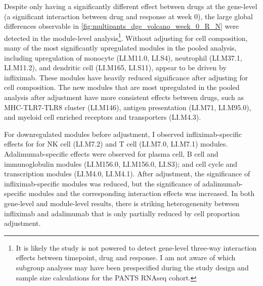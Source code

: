 Despite only  having a significantly different effect between drugs at the gene-level (a significant interaction between drug and response at week 0), 
the large global differences observable in \autoref{fig:multipants_dge_volcano_week_0_R_N} were detected in the module-level analysis\footnote{
It is likely the study is not powered to detect gene-level three-way interaction effects between timepoint, drug and response.
I am not aware of which subgroup analyses may have been prespecified during the study design and sample size calculations for the \gls{PANTS} \gls{RNAseq} cohort.
}.
Without adjusting for cell composition, many of the most significantly upregulated modules in the pooled analysis, 
including upregulation of monocyte (LI.M11.0, LI.S4), neutrophil (LI.M37.1, LI.M11.2), and dendritic cell (LI.M165, LI.S11),
appear to be driven by infliximab.
These modules have heavily reduced significance after adjusting for cell composition.
The new modules that are most upregulated in the pooled analysis after adjustment have more consistent effects between drugs, such as
MHC-TLR7-TLR8 cluster (LI.M146), antigen presentation (LI.M71, LI.M95.0), and myeloid cell enriched receptors and transporters (LI.M4.3).

For downregulated modules before adjustment, I observed infliximab-specific effects for for NK cell (LI.M7.2) and T cell (LI.M7.0, LI.M7.1) modules.
Adalimumab-specific effects were observed for plasma cell, B cell and immunoglobulin modules (LI.M156.0, LI.M156.0, LI.S3); and cell cycle and transcription modules (LI.M4.0, LI.M4.1).
After adjustment, the significance of infliximab-specific modules was reduced, 
but the significance of adalimumab-specific modules and the corresponding interaction effects was increased.
In both gene-level and module-level results, there is striking heterogenenity between infliximab and adalimumab that is only partially reduced by cell proportion adjustment.


